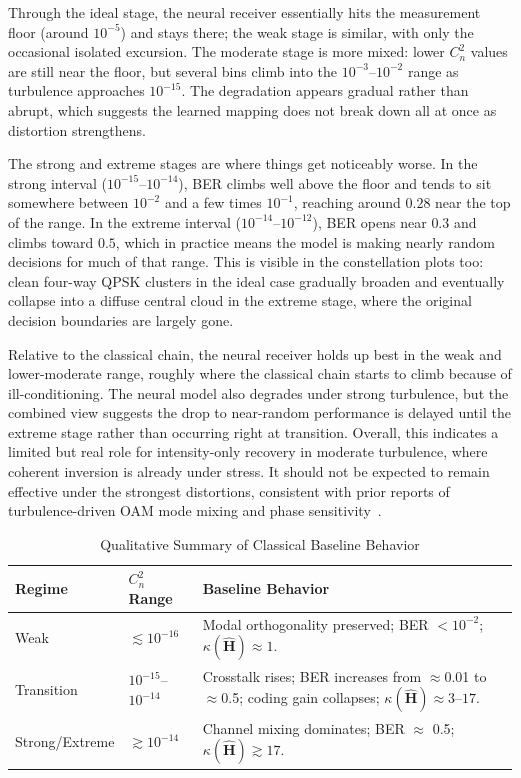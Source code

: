 \documentclass[journal]{IEEEtran}
\begin{document}
Through the ideal stage, the neural receiver essentially hits the measurement floor (around $10^{-5}$) and stays there; the weak stage is similar, with only the occasional isolated excursion. The moderate stage is more mixed: lower $C_n^2$ values are still near the floor, but several bins climb into the $10^{-3}$--$10^{-2}$ range as turbulence approaches $10^{-15}$. The degradation appears gradual rather than abrupt, which suggests the learned mapping does not break down all at once as distortion strengthens.

The strong and extreme stages are where things get noticeably worse. In the strong interval ($10^{-15}$--$10^{-14}$), BER climbs well above the floor and tends to sit somewhere between $10^{-2}$ and a few times $10^{-1}$, reaching around $0.28$ near the top of the range. In the extreme interval ($10^{-14}$--$10^{-12}$), BER opens near $0.3$ and climbs toward $0.5$, which in practice means the model is making nearly random decisions for much of that range. This is visible in the constellation plots too: clean four-way QPSK clusters in the ideal case gradually broaden and eventually collapse into a diffuse central cloud in the extreme stage, where the original decision boundaries are largely gone.

Relative to the classical chain, the neural receiver holds up best in the weak and lower-moderate range, roughly where the classical chain starts to climb because of ill-conditioning. The neural model also degrades under strong turbulence, but the combined view suggests the drop to near-random performance is delayed until the extreme stage rather than occurring right at transition. Overall, this indicates a limited but real role for intensity-only recovery in moderate turbulence, where coherent inversion is already under stress. It should not be expected to remain effective under the strongest distortions, consistent with prior reports of turbulence-driven OAM mode mixing and phase sensitivity~\cite{paterson2005atmospheric, ren2013atmospheric}.

\begin{table}[htbp]
\centering
\caption{Qualitative Summary of Classical Baseline Behavior}
\label{tab:performance_summary}
\small
\renewcommand{\arraystretch}{1.12}
\begin{tabularx}{\columnwidth}{l l X}
\toprule
\textbf{Regime} & \textbf{$C_n^2$ Range} & \textbf{Baseline Behavior} \\
\midrule
Weak & $\lesssim 10^{-16}$ & Modal orthogonality preserved; BER $<10^{-2}$; $\kappa(\hat{\mathbf{H}}) \approx 1$. \\
Transition & $10^{-15}$--$10^{-14}$ & Crosstalk rises; BER increases from $\approx$0.01 to $\approx$0.5; coding gain collapses; $\kappa(\hat{\mathbf{H}}) \approx 3$--$17$. \\
Strong/Extreme & $\gtrsim 10^{-14}$ & Channel mixing dominates; BER $\approx$ 0.5; $\kappa(\hat{\mathbf{H}}) \gtrsim 17$. \\
\bottomrule
\end{tabularx}
\end{table}
\end{document}
